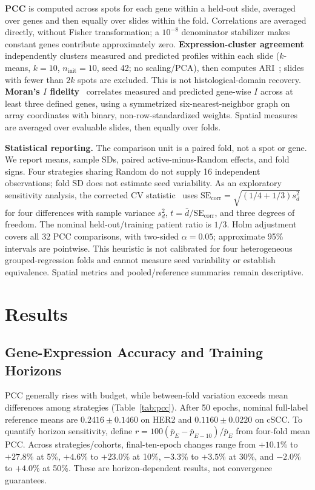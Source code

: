 \documentclass[]{spie}
\begin{document}
\textbf{PCC} is computed across spots for each gene within a held-out slide, averaged over genes and then equally over slides within the fold. Correlations are averaged directly, without Fisher transformation; a $10^{-8}$ denominator stabilizer makes constant genes contribute approximately zero. \textbf{Expression-cluster agreement} independently clusters measured and predicted profiles within each slide ($k$-means, $k=10$, $n_{\mathrm{init}}=10$, seed 42; no scaling/PCA), then computes ARI~\cite{hubert1985comparing}; slides with fewer than $2k$ spots are excluded. This is not histological-domain recovery. \textbf{Moran's $I$ fidelity}~\cite{moran1950notes} correlates measured and predicted gene-wise $I$ across at least three defined genes, using a symmetrized six-nearest-neighbor graph on array coordinates with binary, non-row-standardized weights. Spatial measures are averaged over evaluable slides, then equally over folds.

\textbf{Statistical reporting.} The comparison unit is a paired fold, not a spot or gene. We report means, sample SDs, paired active-minus-Random effects, and fold signs. Four strategies sharing Random do not supply 16 independent observations; fold SD does not estimate seed variability. As an exploratory sensitivity analysis, the corrected CV statistic~\cite{bouckaert2004replicability} uses $\mathrm{SE}_{\mathrm{corr}}=\sqrt{(1/4+1/3)s_d^2}$ for four differences with sample variance $s_d^2$, $t=\bar d/\mathrm{SE}_{\mathrm{corr}}$, and three degrees of freedom. The nominal held-out/training patient ratio is $1/3$. Holm adjustment~\cite{holm1979simple} covers all 32 PCC comparisons, with two-sided $\alpha=0.05$; approximate 95\% intervals are pointwise. This heuristic is not calibrated for four heterogeneous grouped-regression folds and cannot measure seed variability or establish equivalence. Spatial metrics and pooled/reference summaries remain descriptive.

\section{Results}
\label{sec:results}
\subsection{Gene-Expression Accuracy and Training Horizons}

PCC generally rises with budget, while between-fold variation exceeds mean differences among strategies (Table~\ref{tab:pcc}). After 50 epochs, nominal full-label reference means are $0.2416\pm0.1460$ on HER2 and $0.1160\pm0.0220$ on cSCC. To quantify horizon sensitivity, define $r=100(\bar p_E-\bar p_{E-10})/\bar p_E$ from four-fold mean PCC. Across strategies/cohorts, final-ten-epoch changes range from $+10.1$\% to $+27.8$\% at 5\%, $+4.6$\% to $+23.0$\% at 10\%, $-3.3$\% to $+3.5$\% at 30\%, and $-2.0$\% to $+4.0$\% at 50\%. These are horizon-dependent results, not convergence guarantees.
\end{document}

